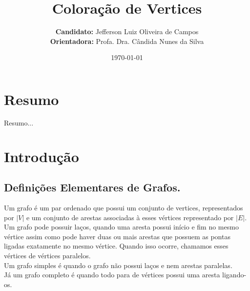 \documentclass[12pt]{article}
\author{\textbf{Candidato:} Jefferson Luiz Oliveira de Campos\\
        \textbf{Orientadora:} Profa. Dra. Cândida Nunes da Silva}
\title{\textbf{Coloração de Vertices}}
\date{\today}
\begin{document}
\maketitle
\thispagestyle{empty}

\newpage
{}
\tableofcontents

\newpage
{}


\section{Resumo}

Resumo...

\section{Introdução}


\subsection{Definições Elementares de Grafos.}
Um grafo é um par ordenado que possui um conjunto de vertices, representados por $|V|$ e um conjunto de arestas associadas à esses vértices representado por $|E|$.\\

Um grafo pode possuir laços, quando uma aresta possui início e fim no mesmo vértice assim como pode haver duas ou mais arestas que possuem as pontas ligadas exatamente no mesmo vértice. Quando isso ocorre, chamamos esses vértices de vértices paralelos.\\

Um grafo simples é quando o grafo não possui laços e nem arestas paralelas.\\ Já um grafo completo é quando todo para de vértices possui uma aresta ligando-os.\\
\end{document}
